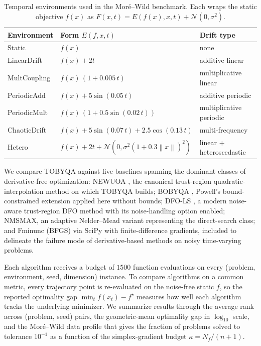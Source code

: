 \documentclass[11pt,a4paper]{article}
\newcommand{\norm}[1]{\left\| #1 \right\|}
\begin{document}
\begin{table}[tbp]
\centering
\caption{Temporal environments used in the Mor\'e--Wild benchmark.
Each wraps the static objective $f(x)$ as
$F(x, t) = E(f(x), x, t) + \mathcal{N}(0, \sigma^2)$.}
\label{tab:envs}
\begin{tabular}{lll}
\toprule
Environment & Form $E(f, x, t)$ & Drift type \\
\midrule
Static        & $f(x)$                                 & none \\
LinearDrift   & $f(x) + 2t$                            & additive linear \\
MultCoupling  & $f(x)\,(1 + 0.005\,t)$                 & multiplicative linear \\
PeriodicAdd   & $f(x) + 5\sin(0.05\,t)$                & additive periodic \\
PeriodicMult  & $f(x)\,(1 + 0.5\sin(0.02\,t))$         & multiplicative periodic \\
ChaoticDrift  & $f(x) + 5\sin(0.07\,t) + 2.5\cos(0.13\,t)$ & multi-frequency \\
Hetero        & $f(x) + 2t + \mathcal{N}(0, \sigma^2(1+0.3\norm{x})^2)$ & linear + heteroscedastic \\
\bottomrule
\end{tabular}
\end{table}

We compare TOBYQA against five baselines spanning the dominant
classes of derivative-free optimization: NEWUOA
\cite{Powell2006NEWUOA}, the canonical trust-region
quadratic-interpolation method on which TOBYQA builds; BOBYQA
\cite{Powell2009BOBYQA}, Powell's bound-constrained extension
applied here without bounds; DFO-LS
\cite{CartisRoberts2019}, a modern noise-aware trust-region DFO
method with its noise-handling option enabled; NMSMAX, an adaptive
Nelder--Mead variant representing the direct-search class; and
Fminunc (BFGS) via SciPy \cite{Virtanen2020} with
finite-difference gradients, included to delineate the failure
mode of derivative-based methods on noisy time-varying problems.

Each algorithm receives a budget of $1500$ function evaluations on
every (problem, environment, seed, dimension) instance. To compare
algorithms on a common metric, every trajectory point is
re-evaluated on the noise-free static $f$, so the reported
optimality gap $\min_t f(x_t) - f^\star$ measures how well each
algorithm tracks the underlying minimizer. We summarize results
through the average rank across (problem, seed) pairs, the
geometric-mean optimality gap in $\log_{10}$ scale, and the
Mor\'e--Wild data profile \cite{MoreWild2009} that gives the
fraction of problems solved to tolerance $10^{-1}$ as a function
of the simplex-gradient budget $\kappa = N_f / (n+1)$.
\end{document}
